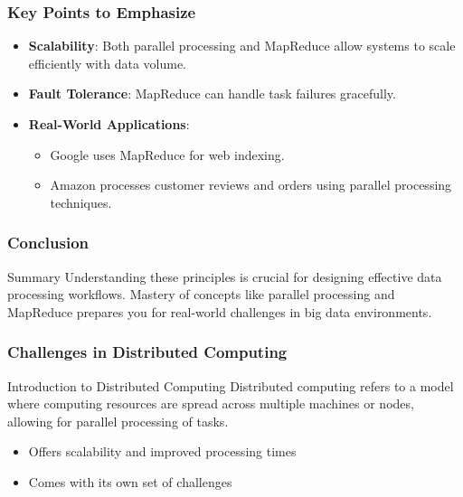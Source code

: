 \documentclass[aspectratio=169]{beamer}
\begin{document}
\begin{frame}[fragile]
    \frametitle{Key Points to Emphasize}
    \begin{itemize}
        \item \textbf{Scalability}: Both parallel processing and MapReduce allow systems to scale efficiently with data volume.
        \item \textbf{Fault Tolerance}: MapReduce can handle task failures gracefully.
        \item \textbf{Real-World Applications}:
            \begin{itemize}
                \item Google uses MapReduce for web indexing.
                \item Amazon processes customer reviews and orders using parallel processing techniques.
            \end{itemize}
    \end{itemize}
\end{frame}

\begin{frame}[fragile]
    \frametitle{Conclusion}
    \begin{block}{Summary}
        Understanding these principles is crucial for designing effective data processing workflows. Mastery of concepts like parallel processing and MapReduce prepares you for real-world challenges in big data environments.
    \end{block}
\end{frame}

\begin{frame}[fragile]
    \frametitle{Challenges in Distributed Computing}
    \begin{block}{Introduction to Distributed Computing}
        Distributed computing refers to a model where computing resources are spread across multiple machines or nodes, allowing for parallel processing of tasks.
        \begin{itemize}
            \item Offers scalability and improved processing times
            \item Comes with its own set of challenges
        \end{itemize}
    \end{block}
\end{frame}
\end{document}
